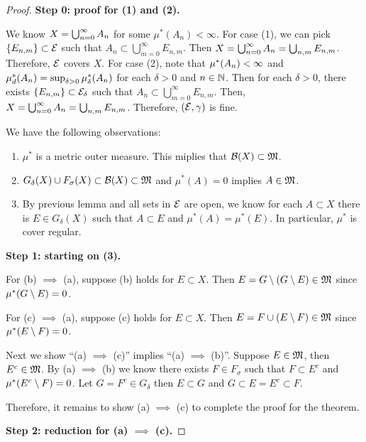 \documentclass[a4paper]{article}
\begin{document}
\begin{proof}

\textbf{Step 0: proof for (1) and (2).} 

We know $X = \bigcup_{n=0}^\infty A_n$ for some $\mu^* 
(A_n) < \infty$. For case (1), we can pick $\left\{ E_{n, m} \right\}
\subset \mathcal{E}$ 
such that $A_n \subset \bigcup_{m=0}^\infty E_{n, m}$. Then 
$X = \bigcup_{n=0}^\infty A_n = \bigcup_{n, m} E_{n, m}$. Therefore, 
$\mathcal{E}$ covers $X$.
For case (2), note that $\mu^*(A_n) < \infty$ 
and $\mu^*_d(A_n) = \sup_{\delta > 0} \mu^*_\delta(A_n)$ 
for each $\delta > 0$ and $n \in \mathbb{N}$.
Then for each $\delta > 0$, 
there exists $\left\{ E_{n, m} \right\} \subset \mathcal{E}_\delta$
such that $A_n \subset \bigcup_{m=0}^\infty E_{n, m}$.
Then,  
$X = \bigcup_{n=0}^\infty A_n = \bigcup_{n, m} E_{n, m}$. Therefore, 
$(\mathcal{E}, \gamma)$ is fine.

We have the following observations: 
\begin{enumerate}
  \item $\mu^*$ is a metric outer measure. This miplies that 
  $\mathcal{B}(X) \subset \mathfrak{M}$. 
  \item $G_\delta(X) \cup F_\sigma(X) \subset \mathcal{B}(X) \subset \mathfrak{M}$
  and $\mu^*(A) = 0$ implies $A \in \mathfrak{M}$.
  \item By previous lemma and all sets in $\mathcal{E}$ are open, 
  we know for each $A \subset X$ there is $E \in G_\delta(X)$
  such that $A \subset E$ and $\mu^*(A) = \mu^*(E)$. 
  In particular, $\mu^*$ is cover regular.
\end{enumerate}

\textbf{Step 1: starting on (3).} 

For (b) $\implies$ (a), suppose (b) holds for $E \subset X$.
Then $E = G \setminus (G \setminus E) \in \mathfrak{M}$ since 
$\mu^*(G \setminus E) = 0$.

For (c) $\implies$ (a), suppose (c) holds for $E \subset X$. 
Then $E = F \cup (E \setminus F) \in \mathfrak{M}$ since 
$\mu^*(E \setminus F) = 0$.

Next we show ``(a) $\implies$ (c)'' implies 
``(a) $\implies$ (b)''. Suppose $E \in \mathfrak{M}$, then 
$E^c \in \mathfrak{M}$. By (a) $\implies$ (b) we know there exists 
$F \in F_\sigma$ such that $F \subset E^c$ and 
$\mu^*(E^c \setminus F) = 0$. Let $G = F^c \in G_\delta$ 
then $E \subset G$ and $G \subset E = E^c \subset F$.

Therefore, it remains to show (a) $\implies$ (c) to complete 
the proof for the theorem. 

\textbf{Step 2: reduction for (a) $\implies$ (c).}


\end{proof}
\end{document}
